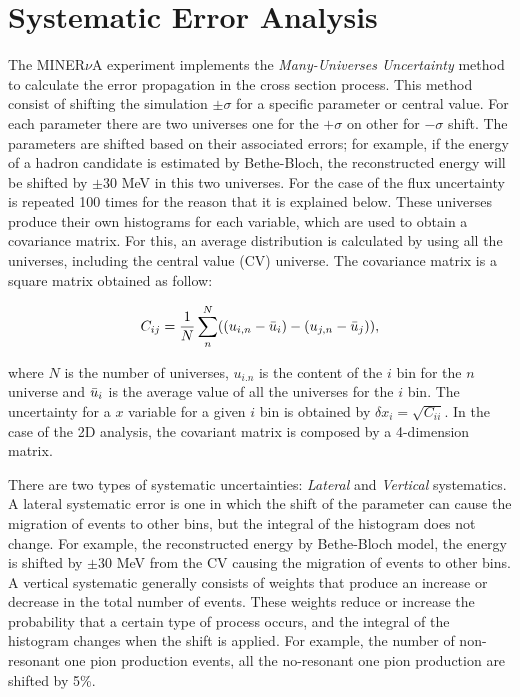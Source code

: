 \chapter{Systematic Error Analysis}
\minitoc
\label{Cap:ErrorAnalysis}

The MINER$\nu$A experiment implements the \textit{Many-Universes Uncertainty} method to calculate the error propagation in the cross section process. This method consist of shifting the simulation $\pm\sigma$ for a specific parameter or central value. For each parameter there are two universes one for the $+\sigma$ on other for $-\sigma$ shift. The parameters are shifted based on their associated errors; for example, if the energy of a hadron candidate is estimated by Bethe-Bloch, the reconstructed energy will be shifted by $\pm30$ MeV in this two universes. For the case of the flux uncertainty is repeated 100 times for the reason that it is explained below. These universes produce their own histograms for each variable, which are used to obtain a covariance matrix. For this, an average distribution is calculated by using all the universes, including the central value (CV) universe. The covariance matrix is a square matrix obtained as follow:

\begin{equation}
    C_{ij}=\frac{1}{N}\sum^N_n((u_{i,n}-\Bar{u}_{i})-(u_{j,n}-\Bar{u}_{j})),
    \label{eq:Systematics:CovMatrix}
\end{equation}

where $N$ is the number of universes, $u_{i.n}$ is the content of the $i$ bin for the $n$ universe and $\Bar{u}_i$ is the average value of all the universes for the $i$ bin. The uncertainty for a $x$ variable for a  given $i$ bin is obtained by $\delta x_i=\sqrt{C_{ii}}$. In the case of the 2D analysis, the covariant matrix is composed by a 4-dimension matrix.

There are two types of systematic uncertainties: \textit{Lateral} and \textit{Vertical} systematics. A lateral systematic error is one in which the shift of the parameter can cause the migration of events to other bins, but the integral of the histogram does not change. For example, the reconstructed energy by Bethe-Bloch model, the energy is shifted by $\pm30$ MeV from the CV causing the migration of events to other bins. A vertical systematic generally consists of weights that produce an increase or decrease in the total number of events. These weights reduce or increase the probability that a certain type of process occurs, and the integral of the histogram changes when the shift is applied. For example, the number of non-resonant one pion production events, all the no-resonant one pion production are shifted by 5\%. 

